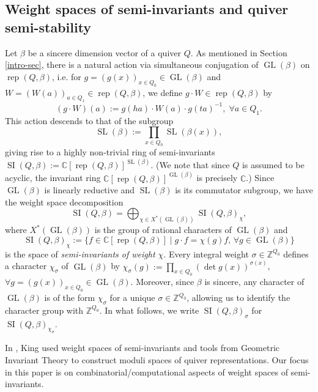\documentclass[11pt]{article}
\theoremstyle{definition}
\numberwithin{equation}{section}
\newcommand{\rep}{\operatorname{rep}}
\newcommand{\SI}{\operatorname{SI}}
\newcommand{\SL}{\operatorname{SL}}
\newcommand{\GL}{\operatorname{GL}}
\newcommand{\ZZ}{\mathbb Z}
\newcommand{\CC}{\mathbb C}
\begin{document}
\subsection{Weight spaces of semi-invariants and quiver semi-stability}

Let $\beta$ be a sincere dimension vector of a quiver $Q$. As mentioned in Section \ref{intro-sec}, there is a natural action via simultaneous conjugation of $\GL(\beta)$ on $\rep(Q,\beta)$, i.e. for $g=(g(x))_{x \in Q_0} \in \GL(\beta)$ and $W=(W(a))_{a \in Q_1} \in \rep(Q,\beta)$, we define $g \cdot W \in \rep(Q, \beta)$ by
\[
(g \cdot W)(a):=g(ha)\cdot W(a) \cdot g(ta)^{-1}, \; \forall a \in Q_1.
\]
This action descends to that of the subgroup
\[
\SL(\beta) := \prod_{x \in Q_0} \SL(\beta(x)),
\]
giving rise to a highly non-trivial ring of semi-invariants $\SI(Q,\beta):= \CC[\rep(Q,\beta)]^{\SL(\beta)}$. (We note that since $Q$ is assumed to be acyclic, the invariant ring $\CC[\rep(Q, \beta)]^{\GL(\beta)}$ is precisely $\CC$.) Since $\GL(\beta)$ is linearly reductive and $\SL(\beta)$ is its commutator subgroup, we have the weight space decomposition 
\[
\SI(Q,\beta) = \bigoplus_{\chi \in X^*(\GL(\beta))} \SI(Q,\beta)_{\chi},
\]
where $X^*(\GL(\beta))$ is the group of rational characters of $\GL(\beta)$ and 
\[
\SI(Q,\beta)_{\chi}:= \{f \in \CC[\rep(Q,\beta)] \mid g \cdot f = \chi(g)f, \, \forall g \in \GL(\beta)\}
\]
is the space of \emph{semi-invariants of weight $\chi$}. Every integral weight $\sigma \in \ZZ^{Q_0}$ defines a character $\chi_{\sigma}$ of $\GL(\beta)$  by $\chi_{\sigma}(g):=\prod_{x \in Q_0} (\det g(x))^{\sigma(x)}$, $\forall g=(g(x))_{x \in Q_0} \in \GL(\beta)$. Moreover, since $\beta$ is sincere, any character of $\GL(\beta)$ is of the form $\chi_{\sigma}$ for a unique $\sigma \in \ZZ^{Q_0}$, allowing us to identify the character group with $\ZZ^{Q_0}$.  In what follows, we write $\SI(Q, \beta)_{\sigma}$ for $\SI(Q, \beta)_{\chi_\sigma}$.

In \cite{K}, King  used weight spaces of semi-invariants and tools from Geometric Invariant Theory to construct moduli spaces of quiver representations. Our focus in this paper is on combinatorial/computational aspects of weight spaces of semi-invariants.  
\end{document}
